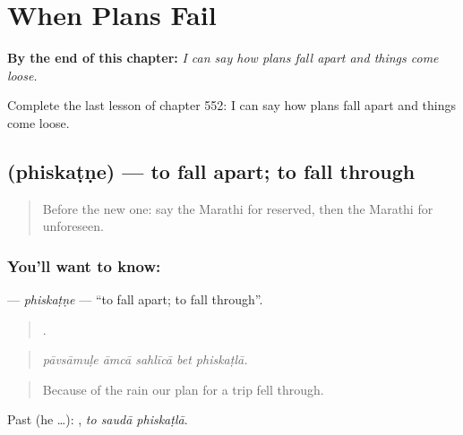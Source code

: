 
\chapter{When Plans Fail}
\label{ch:mr-when-plans-fail}

\begin{chapteropening}
\textbf{By the end of this chapter:} \emph{I can say how plans fall apart and things come loose.}

Complete the last lesson of chapter 552: I can say how plans fall apart and things come loose.
\end{chapteropening}

\section[\texorpdfstring{\mr{फिसकटणे} (phiskaṭṇe)}{फिसकटणे (phiskaṭṇe)}]{ (phiskaṭṇe) — to fall apart; to fall through}

\label{lesson:MR-C552-phiskatne}



\begin{quote}
Before the new one: say the Marathi for reserved, then the Marathi for unforeseen.
\end{quote}

\subsection*{You'll want to know: }
\textbf{} — \emph{phiskaṭṇe} — \textquotedblleft{}to fall apart; to fall through\textquotedblright{}.

\begin{quote}
    .
\end{quote}

\begin{quote}
\emph{pāvsāmuḷe āmcā sahlīcā bet phiskaṭlā.}
\end{quote}

\begin{quote}
Because of the rain our plan for a trip fell through.
\end{quote}

Past (he …):   , \emph{to saudā phiskaṭlā}.

